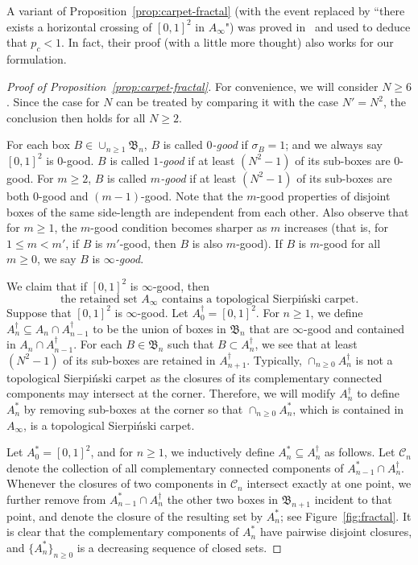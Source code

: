 \documentclass[a4paper]{article}
\numberwithin{equation}{section}
\numberwithin{equation}{section}
\renewcommand{\1}{\mathbf{1}}
\begin{document}
A variant of Proposition~\ref{prop:carpet-fractal} (with the event replaced by ``there exists a horizontal crossing of $[0,1]^2$ in $A_\infty$") was proved in~\cite{CCD-fractal} and used to deduce that $p_c<1$. In fact, their proof (with a little more thought) also works for our formulation.

\begin{proof}[Proof of Proposition~\ref{prop:carpet-fractal}]
    For convenience, we will consider $N\ge 6$. Since the case for $N$ can be treated by comparing it with the case $N'= N^2$, the conclusion then holds for all $N \ge 2$.
    
    For each box $B \in \cup_{n \ge 1} \mathfrak B_n$, $B$ is called \emph{$0$-good} if $\sigma_B=1$; and we always say $[0,1]^2$ is $0$-good. $B$ is called \emph{$1$-good} if at least $(N^2-1)$ of its sub-boxes are $0$-good. For $m \ge 2$, $B$ is called \emph{$m$-good} if at least $(N^2-1)$ of its sub-boxes are both $0$-good and $(m-1)$-good. Note that the $m$-good properties of disjoint boxes of the same side-length are independent from each other.
    Also observe that for $m \ge 1$, the $m$-good condition becomes sharper as $m$ increases (that is, for $1 \le m<m'$, if $B$ is $m'$-good, then $B$ is also $m$-good). If $B$ is $m$-good for all $m \ge 0$, we say $B$ is \emph{$\infty$-good}.
    
    We claim that if $[0,1]^2$ is $\infty$-good, then
    \begin{equation}\label{eq:fractal-carpet-1}
        \mbox{the retained set } A_\infty \mbox{ contains a topological Sierpi\'nski carpet.}
    \end{equation}
    Suppose that $[0,1]^2$ is $\infty$-good. Let $A_0^\dagger = [0,1]^2$. For $n \geq 1$, we define $A_n^\dagger \subseteq A_n \cap A_{n-1}^\dagger$ to be the union of boxes in $\mathfrak B_n$ that are $\infty$-good and contained in $A_n \cap A_{n-1}^\dagger$. For each $B \in \mathfrak B_n$ such that $B \subset A_n^\dagger$, we see that at least $(N^2-1)$ of its sub-boxes are retained in $A_{n+1}^\dagger$. Typically, $\cap_{n \geq 0} A_n^\dagger$ is not a topological Sierpi\'nski carpet as the closures of its complementary connected components may intersect at the corner. Therefore, we will modify $A_n^\dagger$ to define $A_n^*$ by removing sub-boxes at the corner so that $\cap_{n \geq 0} A_n^*$, which is contained in $A_\infty$, is a topological Sierpi\'nski carpet.
    
    Let $A_0^*=[0,1]^2$, and for $n \ge 1$, we inductively define $A_n^* \subseteq A_n^\dagger$ as follows. Let $\mathcal C_n$ denote the collection of all complementary connected components of $A_{n-1}^* \cap A_n^\dagger$. Whenever the closures of two components in $\mathcal C_n$ intersect exactly at one point, we further remove from $A_{n-1}^* \cap A_n^\dagger$ the other two boxes in $\mathfrak B_{n+1}$ incident to that point, and denote the closure of the resulting set by $A_n^*$; see Figure~\ref{fig:fractal}. It is clear that the complementary components of $A_n^*$ have pairwise disjoint closures, and $\{A_n^*\}_{n \ge 0}$ is a decreasing sequence of closed sets.  


\end{proof}
\end{document}
